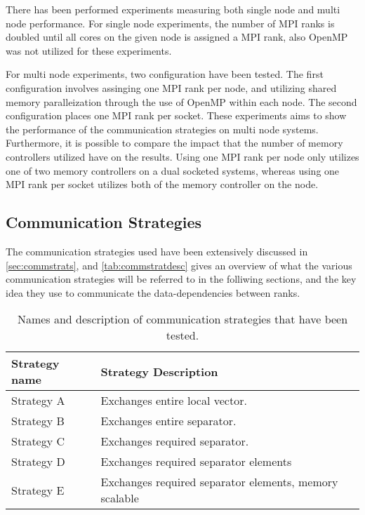There has been performed experiments measuring both single node and multi node performance. For single node experiments, the number of MPI ranks is doubled until all cores on the given node is assigned a MPI rank, also OpenMP was not utilized for these experiments.
\medskip

For multi node experiments, two configuration have been tested. The first configuration involves assinging one MPI rank per node, and utilizing shared memory paralleization through the use of OpenMP within each node. The second configuration places one MPI rank per socket. These experiments aims to show the performance of the communication strategies on multi node systems. Furthermore, it is possible to compare the impact that the number of memory controllers utilized have on the results. Using one MPI rank per node only utilizes one of two memory controllers on a dual socketed systems, whereas using one MPI rank per socket utilizes both of the memory controller on the node.



\subsection{Communication Strategies}
The communication strategies used have been extensively discussed in \ref{sec:commstrats}, and \autoref{tab:commstratdesc} gives an overview of what the various communication strategies will be referred to in the folliwing sections, and the key idea they use to communicate the data-dependencies between ranks.

\begin{table}[H]
    \begin{center}
        \begin{tabular}[c]{|p{3cm}|p{9.5cm}|}
            \hline
             \textbf{Strategy name}& \textbf{Strategy Description}  \\
            \hline
             Strategy A&Exchanges entire local vector.  \\
            \hline
             Strategy B&Exchanges entire separator.  \\
            \hline
             Strategy C&Exchanges required separator.  \\
            \hline
             Strategy D&Exchanges required separator elements  \\
            \hline
             Strategy E&Exchanges required separator elements, memory scalable  \\
            \hline
        \end{tabular}
    \end{center}
    \caption{Names and description of communication strategies that have been tested.}
    \label{tab:commstratdesc}
\end{table}

